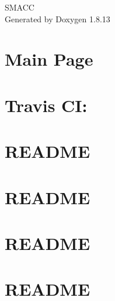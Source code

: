 \documentclass[twoside]{book}
\newcommand{\+}{\discretionary{\mbox{\scriptsize$\hookleftarrow$}}{}{}}
\newcommand{\clearemptydoublepage}{%
  \newpage{\pagestyle{empty}\cleardoublepage}%
}
\begin{document}
\hypersetup{pageanchor=false,
             bookmarksnumbered=true,
             pdfencoding=unicode
            }
\begin{titlepage}
\vspace*{7cm}
\begin{center}%
{\Large S\+M\+A\+CC }\\
\vspace*{1cm}
{\large Generated by Doxygen 1.8.13}\\
\end{center}
\end{titlepage}
\clearemptydoublepage
{}
\tableofcontents
\clearemptydoublepage
{}
\hypersetup{pageanchor=true}

\chapter{Main Page}
\label{index}\hypertarget{index}{}
\chapter{Travis CI\+:}
\label{md_README}

\chapter{R\+E\+A\+D\+ME}
\label{md_smacc_client_library_battery_monitor_client_README}

\chapter{R\+E\+A\+D\+ME}
\label{md_smacc_client_library_keyboard_client_README}

\chapter{R\+E\+A\+D\+ME}
\label{md_smacc_client_library_microstrain_mips_client_README}

\chapter{R\+E\+A\+D\+ME}
\label{md_smacc_client_library_move_base_z_client_README}

\end{document}
